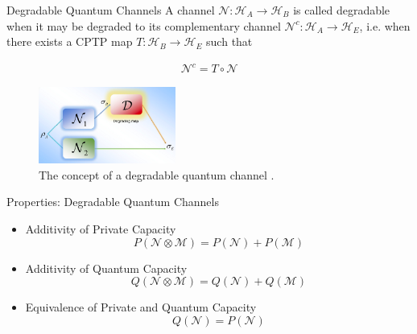 \begin{frame}{Degradable Quantum Channels}
A channel $\mathcal{N}: \mathcal{H}_A \rightarrow \mathcal{H}_B$ is called degradable when it may be degraded to its complementary channel $\mathcal{N}^c: \mathcal{H}_A \rightarrow \mathcal{H}_E$, i.e. when there exists a CPTP map $T: \mathcal{H}_B \rightarrow \mathcal{H}_E$ such that
\begin{tcolorbox}
\begin{align*}
\mathcal{N}^c = T \circ \mathcal{N}
\end{align*}
\end{tcolorbox}

\begin{figure}
    \includegraphics[width=0.4\textwidth]{figures/degradable_quantum_channel.png}
    \caption{The concept of a degradable quantum channel \cite{Gyongyosi2012PropertiesOT}.}
\end{figure}
\end{frame}

\begin{frame}{Properties: Degradable Quantum Channels}
\begin{itemize}
    \setlength{\itemsep}{1.5em}
    \item Additivity of Private Capacity
    $$P(\mathcal{N} \otimes \mathcal{M}) = P(\mathcal{N}) + P(\mathcal{M})$$
    \item Additivity of Quantum Capacity
    $$Q(\mathcal{N} \otimes \mathcal{M}) = Q(\mathcal{N}) + Q(\mathcal{M})$$
    \item Equivalence of Private and Quantum Capacity
    $$Q(\mathcal{N}) = P(\mathcal{N})$$
\end{itemize}
\end{frame}

